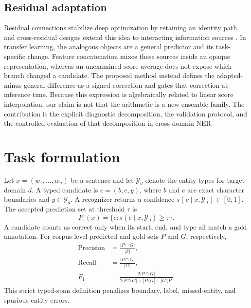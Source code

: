 \documentclass[a4paper,fleqn,numbers,doubleblind]{cas-dc}
\begin{document}
\subsection{Residual adaptation}
Residual connections stabilize deep optimization by retaining an identity path, and cross-residual designs extend this idea to interacting information sources \citep{wang2026crossresidual}. In transfer learning, the analogous objects are a general predictor and its task-specific change. Feature concatenation mixes these sources inside an opaque representation, whereas an unexamined score average does not expose which branch changed a candidate. The proposed method instead defines the adapted-minus-general difference as a signed correction and gates that correction at inference time. Because this expression is algebraically related to linear score interpolation, our claim is not that the arithmetic is a new ensemble family. The contribution is the explicit diagnostic decomposition, the validation protocol, and the controlled evaluation of that decomposition in cross-domain NER.

\section{Task formulation}
Let $x=(w_1,\ldots,w_n)$ be a sentence and let $\mathcal{Y}_d$ denote the entity types for target domain $d$. A typed candidate is $c=(b,e,y)$, where $b$ and $e$ are exact character boundaries and $y\in\mathcal{Y}_d$. A recognizer returns a confidence $s(c\mid x,\mathcal{Y}_d)\in[0,1]$. The accepted prediction set at threshold $\tau$ is
\begin{equation}
P_{\tau}(x)=\{c:s(c\mid x,\mathcal{Y}_d)\geq\tau\}.
\end{equation}
A candidate counts as correct only when its start, end, and type all match a gold annotation. For corpus-level predicted and gold sets $P$ and $G$, respectively,
\begin{align}
\mathrm{Precision} &= \frac{|P\cap G|}{|P|},\\
\mathrm{Recall} &= \frac{|P\cap G|}{|G|},\\
F_1 &= \frac{2|P\cap G|}{2|P\cap G|+|P\setminus G|+|G\setminus P|}.
\end{align}
This strict typed-span definition penalizes boundary, label, missed-entity, and spurious-entity errors.
\end{document}
